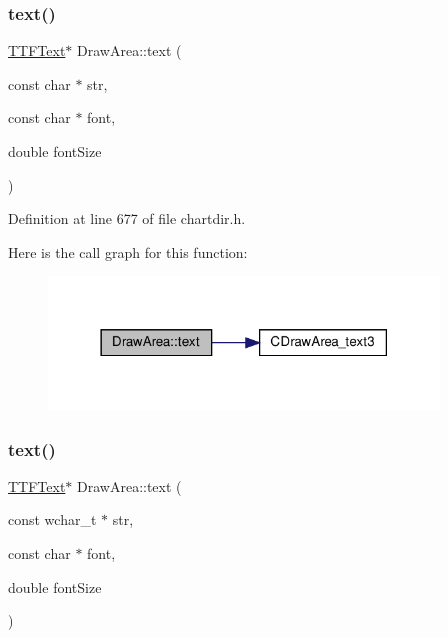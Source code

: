 \subsubsection{\texorpdfstring{text()}{text()}\hspace{0.1cm}{\footnotesize\ttfamily [5/8]}}
{\footnotesize\ttfamily \hyperlink{class_t_t_f_text}{T\+T\+F\+Text}$\ast$ Draw\+Area\+::text (\begin{DoxyParamCaption}\item[{const char $\ast$}]{str,  }\item[{const char $\ast$}]{font,  }\item[{double}]{font\+Size }\end{DoxyParamCaption})\hspace{0.3cm}{\ttfamily [inline]}}



Definition at line 677 of file chartdir.\+h.

Here is the call graph for this function\+:
\nopagebreak
\begin{figure}[H]
\begin{center}
\leavevmode
\includegraphics[width=294pt]{class_draw_area_a5c05c0f1f76ff3b364cf4cf25de6e1a0_cgraph}
\end{center}
\end{figure}
\mbox{\label{class_draw_area_ac71c035d2b44bb229767ec3fb3c9b505}} 
\subsubsection{\texorpdfstring{text()}{text()}\hspace{0.1cm}{\footnotesize\ttfamily [6/8]}}
{\footnotesize\ttfamily \hyperlink{class_t_t_f_text}{T\+T\+F\+Text}$\ast$ Draw\+Area\+::text (\begin{DoxyParamCaption}\item[{const wchar\+\_\+t $\ast$}]{str,  }\item[{const char $\ast$}]{font,  }\item[{double}]{font\+Size }\end{DoxyParamCaption})\hspace{0.3cm}{\ttfamily [inline]}}



